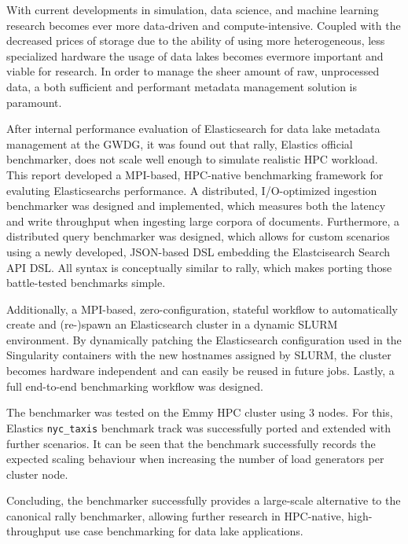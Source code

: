 With current developments in simulation, data science, and machine learning research becomes ever more data-driven and compute-intensive. Coupled with the decreased prices of storage due to the ability of using more heterogeneous, less specialized hardware the usage of data lakes becomes evermore important and viable for research. In order to manage the sheer amount of raw, unprocessed data, a both sufficient and performant metadata management solution is paramount.

After internal performance evaluation of Elasticsearch for data lake metadata management at the GWDG, it was found out that rally, Elastics official benchmarker, does not scale well enough to simulate realistic \ac{HPC} workload. This report developed a \acs{MPI}-based, \acs{HPC}-native benchmarking framework for evaluting Elasticsearchs performance. A distributed, I/O-optimized ingestion benchmarker was designed and implemented, which measures both the latency and write throughput when ingesting large corpora of documents. Furthermore, a distributed query benchmarker was designed, which allows for custom scenarios using a newly developed, JSON-based DSL embedding the Elastcisearch Search API DSL. All syntax is conceptually similar to rally, which makes porting those battle-tested benchmarks simple.

Additionally, a \acs{MPI}-based, zero-configuration, stateful workflow to automatically create and (re-)spawn an Elasticsearch cluster in a dynamic SLURM environment. By dynamically patching the Elasticsearch configuration used in the Singularity containers with the new hostnames assigned by SLURM, the cluster becomes hardware independent and can easily be reused in future jobs. Lastly, a full end-to-end benchmarking workflow was designed.

The benchmarker was tested on the Emmy \acs{HPC} cluster using 3 nodes. For this, Elastics \texttt{nyc\_taxis} benchmark track was successfully ported and extended with further scenarios. It can be seen that the benchmark successfully records the expected scaling behaviour when increasing the number of load generators per cluster node.

Concluding, the benchmarker successfully provides a large-scale alternative to the canonical rally benchmarker, allowing further research in \ac{HPC}-native, high-throughput use case benchmarking for data lake applications.
